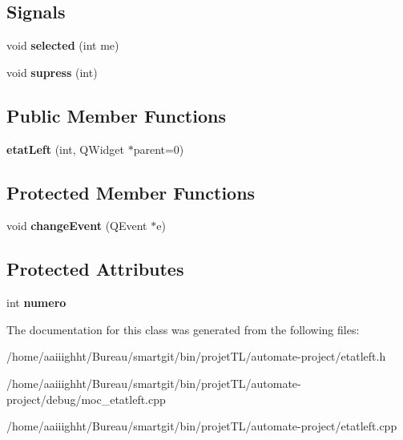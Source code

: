 \subsection*{Signals}
\begin{DoxyCompactItemize}
\item 
\hypertarget{classetat_left_a9c96e4ffbba54cfc6c281e4ab023b4e6}{void {\bfseries selected} (int me)}\label{classetat_left_a9c96e4ffbba54cfc6c281e4ab023b4e6}

\item 
\hypertarget{classetat_left_a8d4e53e9e84d7865f1f95f404cb55132}{void {\bfseries supress} (int)}\label{classetat_left_a8d4e53e9e84d7865f1f95f404cb55132}

\end{DoxyCompactItemize}
\subsection*{Public Member Functions}
\begin{DoxyCompactItemize}
\item 
\hypertarget{classetat_left_ac7e09685da20850a612f710d3db145f7}{{\bfseries etat\-Left} (int, Q\-Widget $\ast$parent=0)}\label{classetat_left_ac7e09685da20850a612f710d3db145f7}

\end{DoxyCompactItemize}
\subsection*{Protected Member Functions}
\begin{DoxyCompactItemize}
\item 
\hypertarget{classetat_left_a3509079b87d2584825e12adddcfb1a32}{void {\bfseries change\-Event} (Q\-Event $\ast$e)}\label{classetat_left_a3509079b87d2584825e12adddcfb1a32}

\end{DoxyCompactItemize}
\subsection*{Protected Attributes}
\begin{DoxyCompactItemize}
\item 
\hypertarget{classetat_left_acf1c86368edc9def78782bf5db7aa651}{int {\bfseries numero}}\label{classetat_left_acf1c86368edc9def78782bf5db7aa651}

\end{DoxyCompactItemize}


The documentation for this class was generated from the following files\-:\begin{DoxyCompactItemize}
\item 
/home/aaiiighht/\-Bureau/smartgit/bin/projet\-T\-L/automate-\/project/etatleft.\-h\item 
/home/aaiiighht/\-Bureau/smartgit/bin/projet\-T\-L/automate-\/project/debug/moc\-\_\-etatleft.\-cpp\item 
/home/aaiiighht/\-Bureau/smartgit/bin/projet\-T\-L/automate-\/project/etatleft.\-cpp\end{DoxyCompactItemize}
